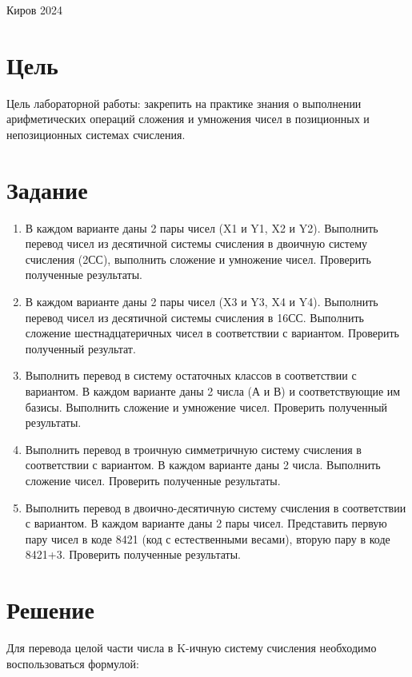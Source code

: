 \documentclass[a4paper,14pt]{extarticle}
\begin{document}
  \begin{center}
    Киров 2024
  \end{center}

  \newpage
  \section*{Цель}
  Цель лабораторной работы: закрепить на практике знания о выполнении арифметических операций сложения и умножения чисел в позиционных и непозиционных системах счисления.

  \section*{Задание}
  \begin{enumerate}
    \item В каждом варианте даны 2 пары чисел (X1 и Y1, X2 и Y2).  Выполнить перевод чисел из десятичной системы счисления в двоичную систему счисления (2СС), выполнить сложение и умножение чисел. Проверить полученные результаты.
    
    \item  В каждом варианте даны 2 пары чисел (X3 и Y3, X4 и Y4). Выполнить перевод чисел из десятичной системы счисления в 16СС.  Выполнить сложение шестнадцатеричных чисел в соответствии с вариантом. Проверить полученный результат.
    
    \item Выполнить перевод в систему остаточных классов в соответствии с вариантом. В каждом варианте даны 2 числа (А и В) и соответствующие им базисы. Выполнить сложение и умножение чисел. Проверить полученный результаты.
    
    \item Выполнить перевод в троичную симметричную систему счисления в соответствии с вариантом. В каждом варианте даны 2 числа. Выполнить сложение чисел. Проверить полученные результаты.
    
    \item Выполнить перевод в двоично-десятичную систему счисления в соответствии с вариантом. В каждом варианте даны 2 пары чисел. Представить первую пару чисел в коде 8421 (код с естественными весами), вторую пару в коде 8421+3. Проверить полученные результаты.
  \end{enumerate}

  \section*{Решение}
  Для перевода целой части числа в K-ичную систему счисления необходимо воспользоваться формулой:
\end{document}
